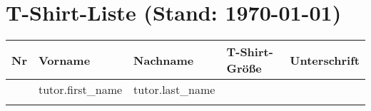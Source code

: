 \documentclass[a4paper]{article}
\newcounter{magicrownumbers}
\newcommand\rownumber{\stepcounter{magicrownumbers}\arabic{magicrownumbers}}
\begin{document}
    \section*{T-Shirt-Liste (Stand: \today)}

    \begin{center}
        \large
        \begin{longtable}{|c|m{}|m{}|m{}|m{}|}
            \hline \bfseries Nr & \bfseries Vorname & \bfseries Nachname &
            \bfseries T-Shirt-Größe & \bfseries
            Unterschrift \\ \hline
            \endhead
            {%
                \rownumber & {{ tutor.first_name }} & {{ tutor.last_name }} &
                {%
\\\hline
            {%
        \end{longtable}
    \end{center}
\end{document}

